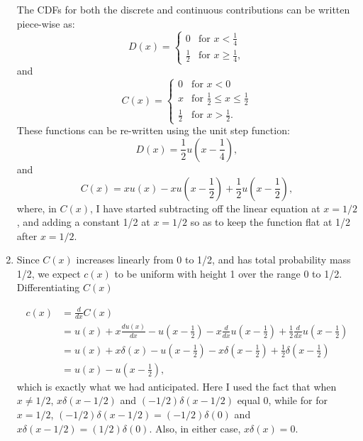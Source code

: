 \begin{problem}{13}
\begin{enumerate}
The CDFs for both the discrete and continuous contributions can be written piece-wise as:
\[
D(x) = 
  \begin{cases}
                                   0 & \text{for $x < \frac{1}{4}$} \\
                                   \frac{1}{2}& \text{for $x \ge \frac{1}{4}$},
  \end{cases}
\]
and
\[
C(x) = 
  \begin{cases}
                                   0 & \text{for $x < 0$} \\
                                   x & \text{for $\frac{1}{2} \le x \le \frac{1}{2}$} \\
                                   \frac{1}{2}& \text{for $x>\frac{1}{2}$}.
  \end{cases}
\]
These functions can be re-written using the unit step function:
\begin{equation*}
D(x) = \frac{1}{2}u\left(x-\frac{1}{4}\right),
\end{equation*}
and
\begin{equation*}
C(x) = xu(x) -  xu\left(x-\frac{1}{2}\right)+\frac{1}{2}u\left(x-\frac{1}{2}\right),
\end{equation*}
where, in $C(x)$, I have started subtracting off the linear equation at $x=1/2$, and adding a constant 1/2 at $x=1/2$ so as to keep the function flat at 1/2 after $x=1/2$.

\item
Since $C(x)$ increases linearly from 0 to 1/2, and has total probability mass 1/2, we expect $c(x)$ to be uniform with height 1 over the range 0 to 1/2.  Differentiating $C(x)$

\begin{align*}
c(x) & = \frac{d}{dx}C(x) \\
& = u(x) +x \frac{du(x)}{dx}-u\left(x-\frac{1}{2}\right)-x \frac{d}{dx}u\left(x-\frac{1}{2}\right)+\frac{1}{2}\frac{d}{dx}u\left(x-\frac{1}{2}\right) \\
& = u(x)+x\delta(x) - u \left (x-\frac{1}{2}\right)-x\delta \left(x-\frac{1}{2}\right)+\frac{1}{2}\delta \left(x-\frac{1}{2}\right) \\
& = u(x) -u\left(x-\frac{1}{2}\right),
\end{align*}
which is exactly what we had anticipated.  Here I used the fact that when $x \ne 1/2$, $x\delta(x-1/2)$ and $(-1/2)\delta(x-1/2)$ equal 0, while for for $x =1/2$, $(-1/2) \delta(x-1/2) = (-1/2)\delta(0)$ and $x \delta(x-1/2) = (1/2)\delta(0)$.  Also, in either case, $x \delta(x) = 0$.


\end{enumerate}
\end{problem}
